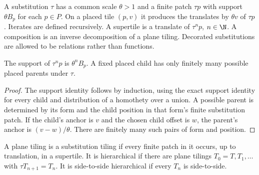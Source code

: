 \begin{definition}[Substitution]\label{def:substitution}
A substitution $\tau$ has a common scale $\theta>1$ and a finite patch
$\tau p$ with support $\theta B_p$ for each $p\in P$. On a placed tile
$(p,v)$ it produces the translates by $\theta v$ of $\tau p$.
Iterates are defined recursively. A supertile is a translate of $\tau^n p$,
$n\in\N$. A composition is an inverse decomposition of a plane tiling.
Decorated substitutions are allowed to be relations rather than functions.
\end{definition}

\begin{lemma}\label{lem:finiteparents}
The support of $\tau^n p$ is $\theta^n B_p$. A fixed placed child has only
finitely many possible placed parents under $\tau$.
\end{lemma}
\begin{proof}
The support identity follows by induction, using the exact support identity
for every child and distribution of a homothety over a union.
A possible parent is determined by its form and the child position in that
form's finite substitution patch. If the child's anchor is $v$ and the
chosen child offset is $w$, the parent's anchor is $(v-w)/\theta$.
There are finitely many such pairs of form and position.
\end{proof}

\begin{definition}\label{def:hierarchy}
A plane tiling is a substitution tiling if every finite patch in it occurs,
up to translation, in a supertile. It is hierarchical if there are plane
tilings $T_0=T,T_1,\ldots$ with $\tau T_{n+1}=T_n$.
It is side-to-side hierarchical if every $T_n$ is side-to-side.
\end{definition}

